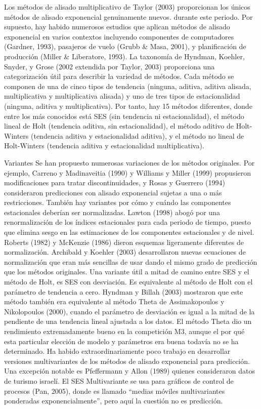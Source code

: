 \documentclass{llncs}
\begin{document}
Los métodos de alisado multiplicativo de Taylor (2003) proporcionan los únicos métodos de alisado exponencial genuinamente nuevos. durante este periodo. Por supuesto, hay habido numerosos estudios que aplican métodos de alisado exponencial en varios contextos incluyendo componentes de computadores (Gardner, 1993), pasajeros de vuelo (Grubb \& Masa, 2001), y planificación de producción (Miller \& Liberatore, 1993).
La taxonomía de Hyndman, Koehler, Snyder, y Grose (2002 extendida por Taylor, 2003) proporciona una categorización útil para describir la variedad de métodos. Cada método se componen de una de cinco tipos de tendencia (ninguna, aditiva, aditiva alisada, multiplicativa y multiplicativa alisada) y uno de tres tipos de estacionalidad (ninguna, aditiva y multiplicativa). Por tanto, hay 15 métodos diferentes, donde entre los más conocidos está SES (sin tendencia ni estacionalidad), el método lineal de Holt (tendencia aditiva, sin estacionalidad), el método aditivo de Holt-Winters (tendencia aditiva y estacionalidad aditiva), y el método no lineal de Holt-Winters (tendencia aditiva y estacionalidad multiplicativa).

Variantes
Se han propuesto numerosas variaciones de los métodos originales. Por ejemplo, Carreno y Madinaveitia (1990) y Williams y Miller (1999) propusieron modificaciones para tratar discontinuidades, y Rosas y Guerrero (1994) consideraron predicciones con alisado exponencial sujetas a una o más restricciones. También hay variantes por cómo y cuándo las componentes estacionales deberían ser normalizadas. Lawton (1998) 
abogó por una renormalización de los índices estacionales para cada periodo de tiempo, puesto que elimina sesgo en las estimaciones de los componentes estacionales y de nivel. Roberts (1982) y McKenzie (1986) dieron esquemas ligeramente diferentes de normalización. Archibald y Koehler (2003) desarrollaron nuevas ecuaciones de normalización que eran más sencillas de usar dando el mismo grado de predicción que los métodos originales.
Una variante útil a mitad de camino entre SES y el método de Holt, es SES con desviación. Es equivalente al método de Holt con el parámetro de tendencia a cero. Hyndman y Billah (2003) mostraron que este método también era equivalente al método Theta de Assimakopoulos y Nikolopoulos (2000), cuando el parámetro de desviación es igual a la mitad de la pendiente de una tendencia lineal ajustada a los datos. El método Theta dio un rendimiento extremadamente bueno en la competición M3, aunque el por qué esta particular elección de modelo y parámetros era buena todavía no se ha determinado.
Ha habido extraordinariamente poco trabajo en desarrollar versiones multivariantes de los métodos de alisado exponencial para predicción. Una excepción notable es Pfeffermann y Allon (1989) quienes consideraron datos de turismo israelí. El SES Multivariante se usa para gráficos de control de procesos (Pan, 2005), donde es llamado “medias móviles multivariantes ponderadas exponencialmente”, pero aquí la cuestión no es predicción.
\end{document}
